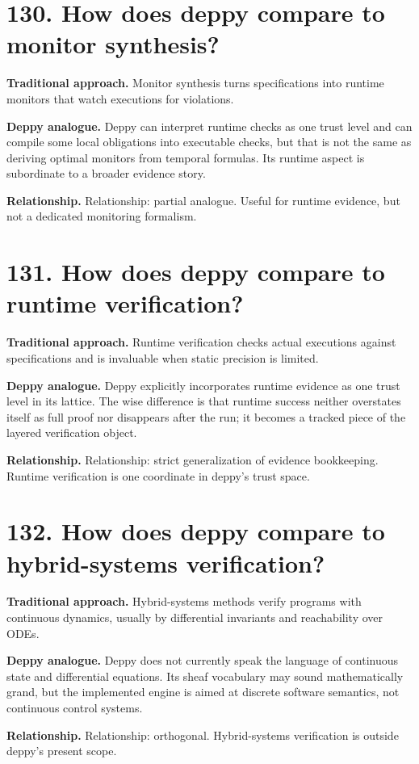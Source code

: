 \documentclass[11pt,openany]{book}
\begin{document}
\section*{130. How does deppy compare to monitor synthesis?}
\textbf{Traditional approach.} Monitor synthesis turns specifications into runtime monitors that watch executions for violations.

\textbf{Deppy analogue.} Deppy can interpret runtime checks as one trust level and can compile some local obligations into executable checks, but that is not the same as deriving optimal monitors from temporal formulas. Its runtime aspect is subordinate to a broader evidence story.

\textbf{Relationship.} Relationship: partial analogue. Useful for runtime evidence, but not a dedicated monitoring formalism.

\section*{131. How does deppy compare to runtime verification?}
\textbf{Traditional approach.} Runtime verification checks actual executions against specifications and is invaluable when static precision is limited.

\textbf{Deppy analogue.} Deppy explicitly incorporates runtime evidence as one trust level in its lattice. The wise difference is that runtime success neither overstates itself as full proof nor disappears after the run; it becomes a tracked piece of the layered verification object.

\textbf{Relationship.} Relationship: strict generalization of evidence bookkeeping. Runtime verification is one coordinate in deppy's trust space.

\section*{132. How does deppy compare to hybrid-systems verification?}
\textbf{Traditional approach.} Hybrid-systems methods verify programs with continuous dynamics, usually by differential invariants and reachability over ODEs.

\textbf{Deppy analogue.} Deppy does not currently speak the language of continuous state and differential equations. Its sheaf vocabulary may sound mathematically grand, but the implemented engine is aimed at discrete software semantics, not continuous control systems.

\textbf{Relationship.} Relationship: orthogonal. Hybrid-systems verification is outside deppy's present scope.
\end{document}
